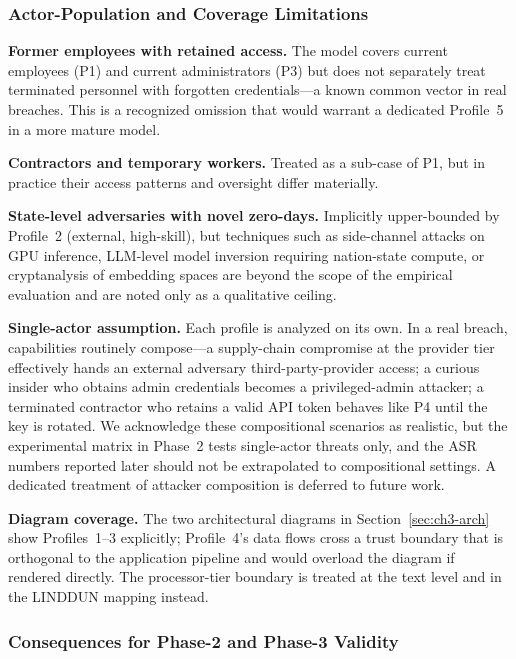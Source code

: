\documentclass[11pt,a4paper]{report}
\begin{document}
\subsubsection{Actor-Population and Coverage Limitations}

\begin{limitbox}
\textbf{Former employees with retained access.} The model covers current
employees (P1) and current administrators (P3) but does not separately
treat terminated personnel with forgotten credentials---a known common
vector in real breaches. This is a recognized omission that would warrant
a dedicated Profile~5 in a more mature model.

\textbf{Contractors and temporary workers.} Treated as a sub-case of P1,
but in practice their access patterns and oversight differ materially.

\textbf{State-level adversaries with novel zero-days.} Implicitly
upper-bounded by Profile~2 (external, high-skill), but techniques such as
side-channel attacks on GPU inference, LLM-level model inversion
requiring nation-state compute, or cryptanalysis of embedding spaces are
beyond the scope of the empirical evaluation and are noted only as a
qualitative ceiling.

\textbf{Single-actor assumption.} Each profile is analyzed on its own.
In a real breach, capabilities routinely compose---a supply-chain
compromise at the provider tier effectively hands an external adversary
third-party-provider access; a curious insider who obtains admin
credentials becomes a privileged-admin attacker; a terminated contractor
who retains a valid API token behaves like P4 until the key is rotated.
We acknowledge these compositional scenarios as realistic, but the
experimental matrix in Phase~2 tests single-actor threats only, and the
ASR numbers reported later should not be extrapolated to compositional
settings. A dedicated treatment of attacker composition is deferred to
future work.

\textbf{Diagram coverage.} The two architectural diagrams in Section~\ref{sec:ch3-arch}
show Profiles~1--3 explicitly; Profile~4's data flows cross a trust
boundary that is orthogonal to the application pipeline and would
overload the diagram if rendered directly. The processor-tier boundary
is treated at the text level and in the LINDDUN mapping instead.
\end{limitbox}

\subsubsection{Consequences for Phase-2 and Phase-3 Validity}
\end{document}
